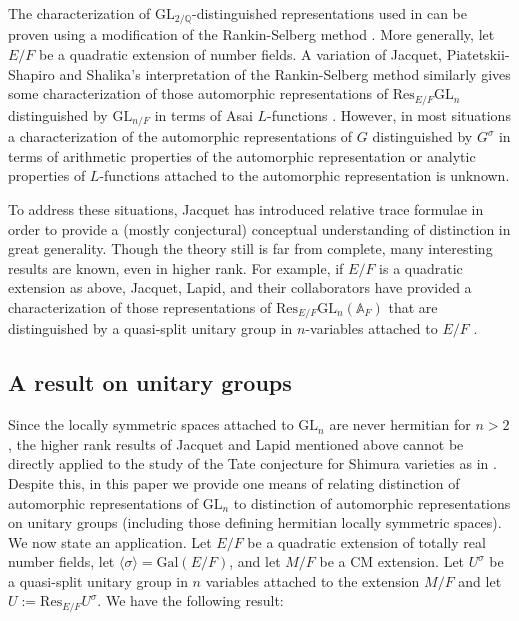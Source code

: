 \documentclass[12pt]{amsart}
\theoremstyle{remark}
\numberwithin{equation}{section}
\newcommand{\A}{\mathbb{A}}
\newcommand{\GL}{\mathrm{GL}}
\newcommand{\Gal}{\mathrm{Gal}}
\newcommand{\QQ}{\mathbb{Q}}
\theoremstyle{definition}
\numberwithin{equation}{subsection}
\begin{document}
The characterization of $\GL_{2/\QQ}$-distinguished representations used in \cite{HLR} can be proven using a modification of the Rankin-Selberg method \cite{Asai}. More generally, let $E/F$ be a quadratic extension of number fields.
A variation of Jacquet, Piatetskii-Shapiro and Shalika's interpretation of the Rankin-Selberg method similarly gives some characterization of those automorphic representations of $\mathrm{Res}_{E/F}\GL_n$ distinguished by $\GL_{n/F}$ in terms of Asai $L$-functions \cite{FlickerDist}.  However, in most situations a characterization of the automorphic representations of $G$ distinguished by $G^{\sigma}$ in terms of arithmetic properties of the automorphic representation or analytic properties of $L$-functions attached to the automorphic representation is unknown.

To address these situations, Jacquet has introduced relative trace formulae in order to provide a (mostly conjectural) conceptual understanding of distinction in great generality.  Though the theory still is far from complete, many interesting results are known, even in higher rank.  For example, if $E/F$ is a quadratic extension as above, Jacquet, Lapid, and their collaborators have provided a characterization of those representations of $\mathrm{Res}_{E/F}\GL_n(\A_F)$ that are distinguished by a  quasi-split unitary group in $n$-variables attached to $E/F$ \cite{JacquetKlII} \cite{Jacquetqs}.

\subsection{A result on unitary groups} Since the locally symmetric spaces attached to $\GL_n$ are never hermitian for $n>2$, the higher rank results of Jacquet and Lapid mentioned above cannot be directly applied to the study of the Tate conjecture for Shimura varieties as in \cite{HLR}.  Despite this, in this paper we provide one means of relating distinction of automorphic representations of $\GL_{n}$ to distinction of automorphic representations on unitary groups (including those defining hermitian locally symmetric spaces).  We now state an application.  Let $E/F$ be a quadratic extension of totally real number fields, let $\langle \sigma \rangle=\Gal(E/F)$, and  let $M/F$ be a CM extension.  Let $U^{\sigma}$ be a quasi-split unitary group in $n$ variables attached to the extension $M/F$ and let $U:=\mathrm{Res}_{E/F}U^{\sigma}$.  We have the following result:
\end{document}
